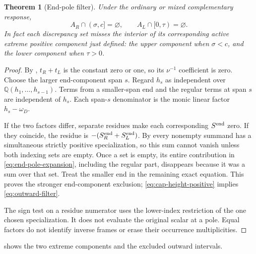 \documentclass[11pt,a4paper]{amsart}
\numberwithin{equation}{section}
\theoremstyle{plain}
\newtheorem{theorem}{Theorem}[section]
\theoremstyle{definition}
\newcommand{\Q}{\mathbb Q}
\begin{document}
\begin{theorem}[End-pole filter]\label{thm:end-filter}
Under the ordinary or mixed complementary response,
\begin{equation}\label{eq:outward-filter}
 A_R\cap(\sigma,c]=\varnothing,\qquad
 A_L\cap[0,\tau)=\varnothing.
\end{equation}
In fact each discrepancy set misses the interior of its corresponding
active extreme positive component just defined: the upper component when
\(\sigma<c\), and the lower component when \(\tau>0\).
\end{theorem}
\begin{proof}
By , \(t_R+t_L\) is the constant zero or one, so its \(\nu^{-1}\) coefficient is zero.  Choose the larger end-component span \(s\).  Regard \(h_s\) as independent over \(\Q(h_1,\ldots,h_{s-1})\).  Terms from a smaller-span end and the regular terms at span \(s\) are independent of \(h_s\).  Each span-\(s\) denominator is the monic linear factor \(h_s-\omega_D\).

If the two factors differ, separate residues make each corresponding \(S^{\rm end}\) zero.  If they coincide, the residue is \(-(S_R^{\rm end}+S_L^{\rm end})\).  By  every nonempty summand has a simultaneous strictly positive specialization, so this sum cannot vanish unless both indexing sets are empty.  Once a set is empty, its entire contribution in \eqref{eq:end-pole-expansion}, including the regular part, disappears because it was a sum over that set.  Treat the smaller end in the remaining exact equation.  This proves the stronger end-component exclusion; \eqref{eq:cap-height-positive} implies \eqref{eq:outward-filter}.

The sign test on a residue numerator uses the lower-index restriction of the one chosen specialization.  It does not evaluate the original scalar at a pole.  Equal factors do not identify inverse frames or erase their occurrence multiplicities.
\end{proof}

 shows the two extreme components and the excluded outward intervals.
\end{document}
